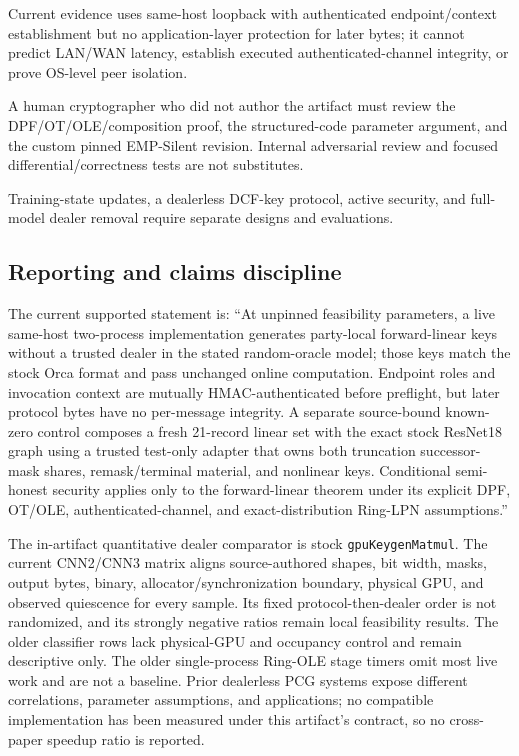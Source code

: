 \documentclass[11pt]{article}
\begin{document}
\begin{description}
  Current evidence uses same-host loopback with authenticated endpoint/context
  establishment but no application-layer protection for later bytes; it cannot
  predict LAN/WAN latency, establish executed authenticated-channel integrity,
  or prove OS-level peer isolation.
\item[Open --- review.] A human cryptographer who did not author the artifact
  must review the DPF/OT/OLE/composition proof, the structured-code parameter
  argument, and the custom pinned EMP-Silent revision. Internal adversarial
  review and focused differential/correctness tests are not substitutes.
\item[Out of scope.] Training-state updates, a dealerless DCF-key protocol,
  active security, and full-model dealer removal require separate designs and
  evaluations.
\end{description}

\subsection{Reporting and claims discipline}
\label{sec:claims}

The current supported statement is: ``At unpinned feasibility parameters, a
live same-host two-process implementation generates party-local forward-linear
keys without a trusted dealer in the stated random-oracle model; those keys
match the stock Orca format and pass unchanged online computation. Endpoint
roles and invocation context are mutually HMAC-authenticated before preflight,
but later protocol bytes have no per-message integrity. A separate source-bound
known-zero control composes a fresh 21-record linear set with the exact stock
ResNet18 graph using a trusted test-only adapter that owns both truncation
successor-mask shares, remask/terminal material, and nonlinear keys. Conditional
semi-honest security applies only to the forward-linear theorem under its
explicit DPF, OT/OLE, authenticated-channel, and exact-distribution Ring-LPN
assumptions.''

The in-artifact quantitative dealer comparator is stock
\texttt{gpuKeygenMatmul}. The current CNN2/CNN3 matrix aligns source-authored
shapes, bit width, masks, output bytes, binary, allocator/synchronization
boundary, physical GPU, and observed quiescence for every sample. Its fixed
protocol-then-dealer order is not randomized, and its strongly negative ratios
remain local feasibility results. The older classifier rows lack physical-GPU
and occupancy control and remain descriptive only. The older single-process
Ring-OLE stage timers omit most live work and are not a baseline.
Prior dealerless PCG systems expose different correlations, parameter
assumptions, and applications; no compatible implementation has been measured
under this artifact's contract, so no cross-paper speedup ratio is reported.
\end{document}
